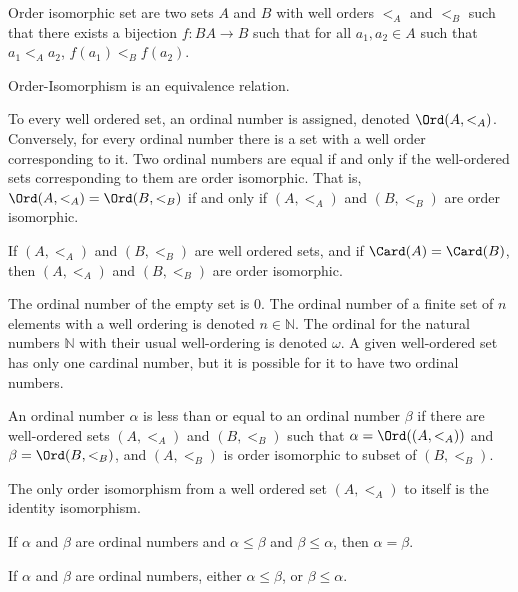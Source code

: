     \begin{definition}
       Order isomorphic set are two sets $A$ and $B$
       with well orders $<_{A}$ and $<_{B}$ such that
       there exists a bijection $f:{B}A\rightarrow{B}$
       such that for all $a_{1},a_{2}\in{A}$ such that
       $a_{1}<_{A}a_{2}$, $f(a_{1})<_{B}f(a_{2})$.
    \end{definition}
    \begin{theorem}
       Order-Isomorphism is an equivalence relation.
    \end{theorem}
    To every well ordered set, an ordinal number is
    assigned, denoted $\Ord(A,<_{A})$. Conversely,
    for every ordinal number there is a set with a
    well order corresponding to it. Two ordinal numbers
    are equal if and only if the well-ordered sets
    corresponding to them are order isomorphic.
    That is,
    $\Ord(A,<_{A})=\Ord(B,<_{B})$ if and only if
    $(A,<_{A})$ and $(B,<_{B})$ are order isomorphic.
    \begin{theorem}
       If $(A,<_{A})$ and $(B,<_{B})$ are well ordered
       sets, and if $\Card(A)=\Card(B)$, then
       $(A,<_{A})$ and $(B,<_{B})$ are order
       isomorphic.
    \end{theorem}
    The ordinal number of the empty set is $0$. The
    ordinal number of a finite set of $n$ elements with
    a well ordering is denoted $n\in\mathbb{N}$.
    The ordinal for the natural numbers $\mathbb{N}$
    with their usual well-ordering is denoted $\omega$.
    A given well-ordered set has only one cardinal number,
    but it is possible for it to have two ordinal numbers.
    \begin{definition}
        An ordinal number $\alpha$ is less than or equal to an ordinal
        number $\beta$ if there are well-ordered sets $(A,<_{A})$ and
        $(B,<_{B})$ such that $\alpha=\Ord((A,<_{A}))$ and
        $\beta=\Ord(B,<_{B})$, and $(A,<_{B})$ is order isomorphic to
        subset of $(B,<_{B})$.
    \end{definition}
    \begin{theorem}
        The only order isomorphism from a well ordered set $(A,<_{A})$ to
        itself is the identity isomorphism.
    \end{theorem}
    \begin{theorem}
        If $\alpha$ and $\beta$ are ordinal numbers and
        ${\alpha}\leq{\beta}$ and ${\beta}\leq{\alpha}$,
        then $\alpha=\beta$.
    \end{theorem}
    \begin{theorem}
        If $\alpha$ and $\beta$ are ordinal numbers, either
        ${\alpha}\leq{\beta}$, or ${\beta}\leq{\alpha}$.
    \end{theorem}
